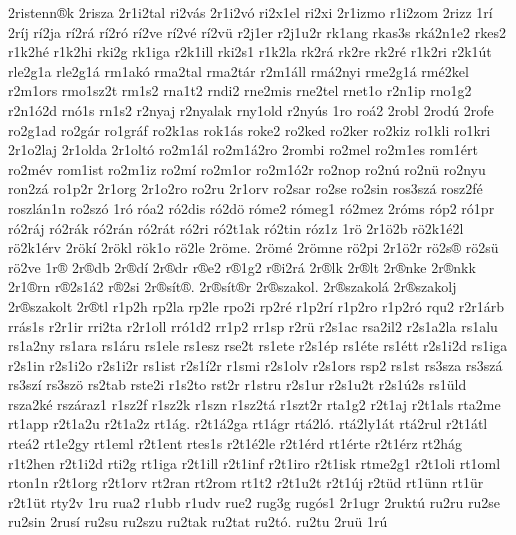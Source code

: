 {2ristenn^^aek
2risza
2r1i2tal
ri2v^^e1s
2r1i2v^^f3
ri2x1el
ri2xi
2r1izmo
r1i2zom
2rizz
1r^^ed
2r^^edj
r^^ed2ja
r^^ed2r^^e1
r^^ed2r^^f3
r^^ed2ve
r^^ed2v^^e9
r^^ed2v^^fc
r2j1er
r2j1u2r
rk1ang
rkas3s
rk^^e12n1e2
rkes2
r1k2h^^e9
r1k2hi
rki2g
rk1iga
r2k1ill
rki2s1
r1k2la
rk2r^^e1
rk2re
rk2r^^e9
r1k2ri
r2k1^^fat
rle2g1a
rle2g1^^e1
rm1ak^^f3
rma2tal
rma2t^^e1r
r2m1^^e1ll
rm^^e12nyi
rme2g1^^e1
rm^^e92kel
r2m1ors
rmo1sz2t
rm1s2
rna1t2
rndi2
rne2mis
rne2tel
rnet1o
r2n1ip
rno1g2
r2n1^^f32d
rn^^f31s
rn1s2
r2nyaj
r2nyalak
rny1old
r2ny^^fas
1ro
ro^^e12
2robl
2rod^^fa
2rofe
ro2g1ad
ro2g^^e1r
ro1gr^^e1f
ro2k1as
rok1^^e1s
roke2
ro2ked
ro2ker
ro2kiz
ro1kli
ro1kri
2r1o2laj
2r1olda
2r1olt^^f3
ro2m1^^e1l
ro2m1^^e12ro
2rombi
ro2mel
ro2m1es
rom1^^e9rt
ro2m^^e9v
rom1ist
ro2m1iz
ro2m^^ed
ro2m1or
ro2m1^^f32r
ro2nop
ro2n^^fa
ro2n^^fc
ro2nyu
ron2z^^e1
ro1p2r
2r1org
2r1o2ro
ro2ru
2r1orv
ro2sar
ro2se
ro2sin
ros3sz^^e1
rosz2f^^e9
roszl^^e1n1n
ro2sz^^f3
1r^^f3
r^^f3a2
r^^f32dis
r^^f32d^^f6
r^^f3me2
r^^f3meg1
r^^f32mez
2r^^f3ms
r^^f3p2
r^^f31pr
r^^f32r^^e1j
r^^f32r^^e1k
r^^f32r^^e1n
r^^f32r^^e1t
r^^f32ri
r^^f32t1ak
r^^f32tin
r^^f3z1z
1r^^f6
2r1^^f62b
r^^f62k1^^e92l
r^^f62k1^^e9rv
2r^^f6k^^ed
2r^^f6kl
r^^f6k1o
r^^f62le
2r^^f6me.
2r^^f6m^^e9
2r^^f6mne
r^^f62pi
2r1^^f62r
r^^f62s^^ae
r^^f62s^^fc
r^^f62ve
1r^^ae
2r^^aedb
2r^^aed^^ed
2r^^aedr
r^^aee2
r^^ae1g2
r^^aei2r^^e1
2r^^aelk
2r^^aelt
2r^^aenke
2r^^aenkk
2r1^^aern
r^^ae2s1^^e12
r^^ae2si
2r^^aes^^edt^^ae.
2r^^aes^^edt^^aer
2r^^aeszakol.
2r^^aeszakol^^e1
2r^^aeszakolj
2r^^aeszakolt
2r^^aetl
r1p2h
rp2la
rp2le
rpo2i
rp2r^^e9
r1p2r^^ed
r1p2ro
r1p2r^^f3
rqu2
r2r1^^e1rb
rr^^e1s1s
r2r1ir
rri2ta
r2r1oll
rr^^f31d2
rr1p2
rr1sp
r2r^^fc
r2s1ac
rsa2il2
r2s1a2la
rs1alu
rs1a2ny
rs1ara
rs1^^e1ru
rs1ele
rs1esz
rse2t
rs1ete
r2s1^^e9p
rs1^^e9te
rs1^^e9tt
r2s1i2d
rs1iga
r2s1in
r2s1i2o
r2s1i2r
rs1ist
r2s1^^ed2r
r1smi
r2s1olv
r2s1ors
rsp2
rs1st
rs3sza
rs3sz^^e1
rs3sz^^ed
rs3sz^^f6
rs2tab
rste2i
r1s2to
rst2r
r1stru
r2s1ur
r2s1u2t
r2s1^^fa2s
rs1^^fcld
rsza2k^^e9
rsz^^e1raz1
r1sz2f
r1sz2k
r1szn
r1sz2t^^e1
r1szt2r
rta1g2
r2t1aj
r2t1als
rta2me
rt1app
r2t1a2u
r2t1a2z
rt1^^e1g.
r2t1^^e12ga
rt1^^e1gr
rt^^e12l^^f3.
rt^^e12ly1^^e1t
rt^^e12rul
r2t1^^e1tl
rte^^e12
rt1e2gy
rt1eml
r2t1ent
rtes1s
r2t1^^e92le
r2t1^^e9rd
rt1^^e9rte
r2t1^^e9rz
rt2h^^e1g
r1t2hen
r2t1i2d
rti2g
rt1iga
r2t1ill
r2t1inf
r2t1iro
r2t1isk
rtme2g1
r2t1oli
rt1oml
rton1n
r2t1org
r2t1orv
rt2ran
rt2rom
rt1t2
r2t1u2t
r2t1^^faj
r2t^^fcd
rt1^^fcnn
rt1^^fcr
r2t1^^fct
rty2v
1ru
rua2
r1ubb
r1udv
rue2
rug3g
rug^^f3s1
2r1ugr
2rukt^^fa
ru2ru
ru2se
ru2sin
2rus^^ed
ru2su
ru2szu
ru2tak
ru2tat
ru2t^^f3.
ru2tu
2ru^^fc
1r^^fa
}
